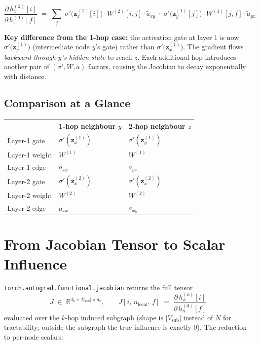 \documentclass[11pt]{article}
\begin{document}
\begin{equation}
  \boxed{
  \frac{\partial\, h_x^{(2)}[i]}{\partial\, h_z^{(0)}[f]}
  \;=\;
  \sum_j\;
  \sigma'\!\bigl(\mathbf{z}_x^{(2)}[i]\bigr)\cdot W^{(2)}[i,j]\cdot\tilde{a}_{xy}
  \;\cdot\;
  \sigma'\!\bigl(\mathbf{z}_y^{(1)}[j]\bigr)\cdot W^{(1)}[j,f]\cdot\tilde{a}_{yz}
  }
\end{equation}

\medskip
\noindent\textbf{Key difference from the 1-hop case:} the activation gate
at layer 1 is now $\sigma'\!\bigl(\mathbf{z}_y^{(1)}\bigr)$ (intermediate
node $y$'s gate) rather than $\sigma'\!\bigl(\mathbf{z}_x^{(1)}\bigr)$.
The gradient flows \emph{backward through $y$'s hidden state} to reach $z$.
Each additional hop introduces another pair of $(\sigma', W, \tilde{a})$
factors, causing the Jacobian to decay exponentially with distance.

\subsection{Comparison at a Glance}

\begin{center}
\renewcommand{\arraystretch}{1.5}
\begin{tabular}{lll}
\toprule
 & \textbf{1-hop neighbour }$y$ & \textbf{2-hop neighbour }$z$ \\
\midrule
Layer-1 gate   & $\sigma'\!\left(\mathbf{z}_x^{(1)}\right)$ & $\sigma'\!\left(\mathbf{z}_y^{(1)}\right)$ \\
Layer-1 weight & $W^{(1)}$ & $W^{(1)}$ \\
Layer-1 edge   & $\tilde{a}_{xy}$ & $\tilde{a}_{yz}$ \\
Layer-2 gate   & $\sigma'\!\left(\mathbf{z}_x^{(2)}\right)$ & $\sigma'\!\left(\mathbf{z}_x^{(2)}\right)$ \\
Layer-2 weight & $W^{(2)}$ & $W^{(2)}$ \\
Layer-2 edge   & $\tilde{a}_{xx}$ & $\tilde{a}_{xy}$ \\
\bottomrule
\end{tabular}
\end{center}

\section{From Jacobian Tensor to Scalar Influence}

\texttt{torch.autograd.functional.jacobian} returns the full tensor
\[
  J \;\in\; \mathbb{R}^{d_k \times |V_\text{sub}| \times d_0},
  \qquad
  J[i,\, n_\text{local},\, f]
  \;=\;
  \frac{\partial\, h_x^{(k)}[i]}{\partial\, h_{n}^{(0)}[f]}
\]
evaluated over the $k$-hop induced subgraph (shape is $|V_\text{sub}|$
instead of $N$ for tractability; outside the subgraph the true influence
is exactly 0). The reduction to per-node scalars:
\end{document}
